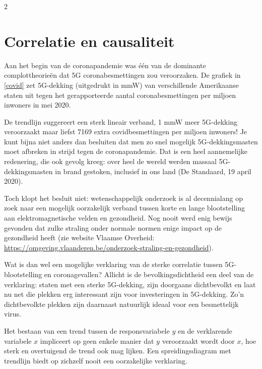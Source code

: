 \begin{multicols}{2}

     \section{Correlatie en causaliteit} \label{section:Correlatie en causaliteit}
Aan het begin van de coronapandemie was één van de dominante complottheorieën dat 5G coronabesmettingen zou veroorzaken. De grafiek in \autoref{covid} zet 5G-dekking (uitgedrukt in mmW) van verschillende Amerikaanse staten uit tegen het gerapporteerde aantal coronabesmettingen per miljoen inwoners in mei 2020. 

De trendlijn suggereert een sterk lineair verband, 1 mmW meer 5G-dekking veroorzaakt maar liefst 7169 extra covidbesmettingen per miljoen inwoners! Je kunt bijna niet anders dan besluiten dat men zo snel mogelijk 5G-dekkingsmasten moet afbreken in strijd tegen de coronapandemie. Dat is een heel aannemelijke redenering, die ook gevolg kreeg: over heel de wereld werden massaal 5G-dekkingsmasten in brand gestoken, inclusief in ons land (De Standaard, 19 april 2020). 

Toch klopt het besluit niet: wetenschappelijk onderzoek is al decennialang op zoek naar een mogelijk oorzakelijk verband tussen korte en lange blootstelling aan elektromagnetische velden en gezondheid. Nog nooit werd enig bewijs gevonden dat zulke straling onder normale normen enige impact op de gezondheid heeft (zie website Vlaamse Overheid: \url{https://omgeving.vlaanderen.be/onderzoek-straling-en-gezondheid}). 

Wat is dan wel een mogelijke verklaring van de sterke correlatie tussen 5G-blootstelling en coronagevallen? Allicht is de bevolkingsdichtheid een deel van de verklaring: staten met een sterke 5G-dekking, zijn doorgaans dichtbevolkt en laat nu net die plekken erg interessant zijn voor investeringen in 5G-dekking. Zo'n dichtbevolkte plekken zijn daarnaast natuurlijk ideaal voor een besmettelijk virus. 

	
Het bestaan van een trend tussen de responsvariabele $y$ en de verklarende variabele $x$ impliceert op geen enkele manier dat $y$ veroorzaakt wordt door $x$, hoe sterk en overtuigend de trend ook mag lijken. Een spreidingsdiagram met trendlijn biedt op zichzelf nooit een oorzakelijke verklaring. 


\end{multicols}
